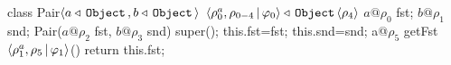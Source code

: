 \vspace*{-0.1in}
\begin{center}
\begin{codejava}
class Pair$\langle a\triangleleft\,{\tt Object}\,, b\triangleleft\,{\tt Object}\, \rangle$
          $\langle \rho^a_0,\rho_{0-4}\,|\,\varphi_0 \rangle \triangleleft \,{\tt Object}\,\langle \rho_4 \rangle$ {
  $a@\rho_0$ fst; $b@\rho_1$ snd;
  Pair($a@\rho_2$ fst, $b@\rho_3$ snd) { 
    super(); this.fst=fst; this.snd=snd; 
  }
  a@$\rho_5$ getFst$\langle \rho^a_1,\rho_5\,|\,\varphi_1 \rangle$() { return this.fst; }
}
\end{codejava}
\end{center}
\vspace*{-0.1in}
%
%
